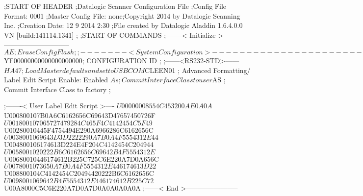 ;START OF HEADER
;Datalogic Scanner Configuration File
;Config File Format: 0001
;Master Config File: none;Copyright 2014 by Datalogic Scanning Inc.
;Creation Date: 12 9 2014 2:30
;File created by Datalogic Aladdin 1.6.4.0.0 VN [build:141114.1341]
;
;START OF COMMANDS
;-------< Initialize >-----------------------------
$AE                 ; Erase Config Flash
;
;-------< System Configuration >-------------------------------
$YF00000000000000000000; CONFIGURATION ID
;
;------<RS232-STD>------
$HA47               ; Load Master defaults and set to USBCOM
$CLEEN01            ; Advanced Formatting/ Label Edit Script Enable: Enabled
$As                 ; Commit Interface Class to user
$AS                 ; Commit Interface Class to factory
;

;-------< User Label Edit Script >----
$U00000008554C453200AE0A0A
$U000800107B0A6C6162656C69643D47657450726F
$U001800107065727479284C465F4C4142454C5F49
$U00280010445F4754494E290A6966286C6162656C
$U0038001069643D3D2222290A7B0A4F5554312E44
$U004800106174613D224E4F204C4142454C204944
$U0058001020222B6C6162656C69642B4F5554312E
$U00680010446174612B225C725C6E220A7D0A656C
$U0078001073650A7B0A4F5554312E446174613D22
$U008800104C4142454C20494420222B6C6162656C
$U0098001069642B4F5554312E446174612B225C72
$U00A8000C5C6E220A7D0A7D0A0A0A0A0A
;------< End >-----------------------
